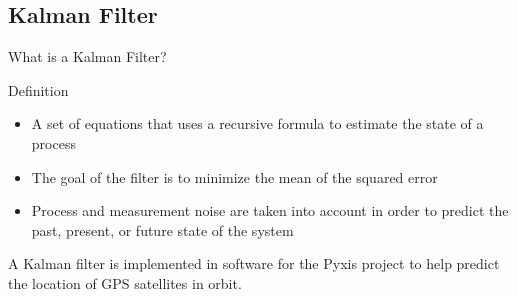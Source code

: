 \documentclass[10pt,aspectratio=169]{beamer}
\begin{document}
\subsection{Kalman Filter}
	\begin{frame}{What is a Kalman Filter?}
		\begin{block}{Definition}
			\begin{itemize}
				\item A set of equations that uses a recursive formula to estimate the state of a process
				\item The goal of the filter is to minimize the mean of the squared error
				\item Process and measurement noise are taken into account in order to predict the past, present, or future state of the system \cite{welch:1995}
			\end{itemize}
		\end{block}
		\vspace{.5em}
		A Kalman filter is implemented in software for the Pyxis project to help predict the location of GPS satellites in orbit.
	\end{frame}
\end{document}
